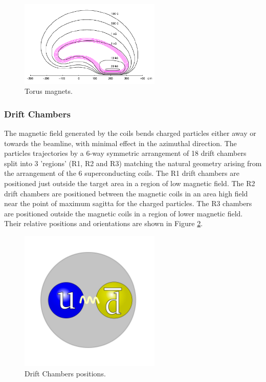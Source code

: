 \begin{figure}
	\centering
	\includegraphics[width=0.6\textwidth]{ImgChap1/mag1}
	\caption{Torus magnets.}
	\label{MagneticFields2}
\end{figure}

\subsubsection{Drift Chambers} \cite{mestayer2000clas} \cite{carman1998region} \cite{qin1998prototype}

The magnetic field generated by the coils bends charged particles either away or towards the beamline, with minimal effect in the azimuthal direction. The particles trajectories by a 6-way symmetric arrangement of 18 drift chambers split into 3 'regions' (R1, R2 and R3) matching the natural geometry arising from the arrangement of the 6 superconducting coils. The R1 drift chambers are positioned just outside the target area in a region of low magnetic field. The R2 drift chambers are positioned between the magnetic coils in an area high field near the point of maximum sagitta for the charged particles. The R3 chambers are positioned outside the magnetic coils in a region of lower magnetic field. Their relative positions and orientations are shown in Figure \ref{CLASdrift}.

\begin{figure}
	\centering
	\includegraphics[width=0.6\textwidth]{ImgChap1/meson2}
	\caption{Drift Chambers positions.}
	\label{CLASdrift}
\end{figure}

